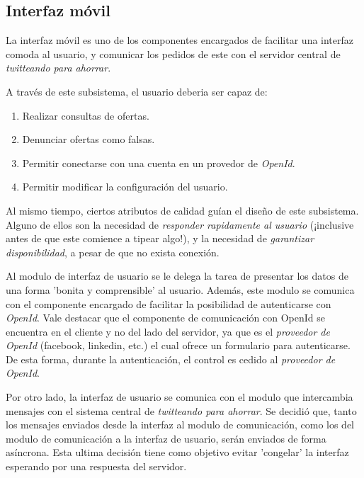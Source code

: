 \subsection{Interfaz móvil}

La interfaz móvil es uno de los componentes encargados de facilitar una interfaz comoda al usuario, y comunicar los pedidos de este con el servidor central de \emph{twitteando para ahorrar}.

A través de este subsistema, el usuario deberia ser capaz de:
\begin{enumerate}
	\item Realizar consultas de ofertas.
	\item Denunciar ofertas como falsas.
	\item Permitir conectarse con una cuenta en un provedor de \emph{OpenId}.
	\item Permitir modificar la configuración del usuario.
\end{enumerate}

Al mismo tiempo, ciertos atributos de calidad guían el diseño de este subsistema. Alguno de ellos son la necesidad de \emph{responder rapidamente al usuario} (¡inclusive antes de que este comience a tipear algo!), y la necesidad de \emph{garantizar disponibilidad}, a pesar de que no exista conexión.

Al modulo de interfaz de usuario se le delega la tarea de presentar los datos de una forma 'bonita y comprensible' al usuario. Además, este modulo se comunica con el componente encargado de facilitar la posibilidad de autenticarse con \emph{OpenId}. Vale destacar que el componente de comunicación con OpenId se encuentra en el cliente y no del lado del servidor, ya que es el \emph{proveedor de OpenId} (\textsf{facebook}, \textsf{linkedin}, etc.) el cual ofrece un formulario para autenticarse. De esta forma, durante la autenticación, el control es cedido al \emph{proveedor de OpenId}.

Por otro lado, la interfaz de usuario se comunica con el modulo que intercambia mensajes con el sistema central de \emph{twitteando para ahorrar}. Se decidió que, tanto los mensajes enviados desde la interfaz al modulo de comunicación, como los del modulo de comunicación a la interfaz de usuario, serán enviados de forma asíncrona. Esta ultima decisión tiene como objetivo evitar 'congelar' la interfaz esperando por una respuesta del servidor. 

